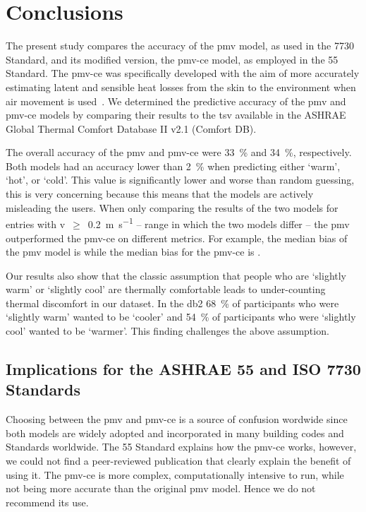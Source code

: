 
\section{Conclusions}\label{sec:conclusions}
The present study compares the accuracy of the \ac{pmv} model, as used in the \gls{7730} Standard, and its modified version, the \ac{pmv-ce} model, as employed in the \gls{55} Standard.
The \ac{pmv-ce} was specifically developed with the aim of more accurately estimating latent and sensible heat losses from the skin to the environment when air movement is used~\cite{arens_moving_2009}.
We determined the predictive accuracy of the \ac{pmv} and \ac{pmv-ce} models by comparing their results to the \ac{tsv} available in the ASHRAE Global Thermal Comfort Database II v2.1 (Comfort DB).

The overall accuracy of the \ac{pmv} and \ac{pmv-ce} were \qty{33}{\percent} and \qty{34}{\percent}, respectively.
Both models had an accuracy lower than \qty{2}{\percent} when predicting either `warm', `hot', or `cold'.
This value is significantly lower and worse than random guessing, this is very concerning because this means that the models are actively misleading the users.
When only comparing the results of the two models for entries with \ac{v}~$\geq$~\qty{0.2}{\m\per\s} -- range in which the two models differ -- the \ac{pmv} outperformed the \ac{pmv-ce} on different metrics.
For example, the median bias of the \ac{pmv} model is  while the median bias for the \ac{pmv-ce} is .

Our results also show that the classic assumption that people who are `slightly warm' or `slightly cool' are thermally comfortable leads to under-counting thermal discomfort in our dataset.
In the \ac{db2} \qty{68}{\percent} of participants who were `slightly warm' wanted to be `cooler' and \qty{54}{\percent} of participants who were `slightly cool' wanted to be `warmer'.
This finding challenges the above assumption.

\subsection{Implications for the ASHRAE 55 and ISO 7730 Standards}\label{subsec:implications-for-the-ashrae-55-and-iso-7730-standards}
Choosing between the \ac{pmv} and \ac{pmv-ce} is a source of confusion wordwide since both models are widely adopted and incorporated in many building codes and Standards worldwide.
The \gls{55} Standard explains how the \ac{pmv-ce} works, however, we could not find a peer-reviewed publication that clearly explain the benefit of using it.
The \ac{pmv-ce} is more complex, computationally intensive to run, while not being more accurate than the original \ac{pmv} model.
Hence we do not recommend its use.

